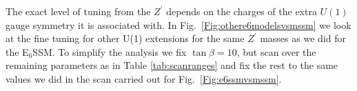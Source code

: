 \documentclass[preprint,amsmath,amssymb,aps,superscriptaddress,prd,showpacs,floatfix,nofootinbib]{revtex4-1}
\begin{document}
The exact level of tuning from the $Z^\prime$ depends on the charges
of the extra $U(1)$ gauge symmetry it is associated with.  In
Fig.~\ref{Fig:othere6modelsvsmssm} we look at the fine tuning for
other U(1) extensions for the same $Z^\prime$ masses as we did for the
E$_6$SSM.  To simplify the analysis we fix $\tan \beta = 10$, but scan
over the remaining parameters as in Table \ref{tab:scanranges} and fix
the rest to the same values we did in the scan carried out for
Fig.~\ref{Fig:e6ssmvsmssm}.

\begin{figure}
\begin{center}
\\

\end{center}
\end{figure}
\end{document}
